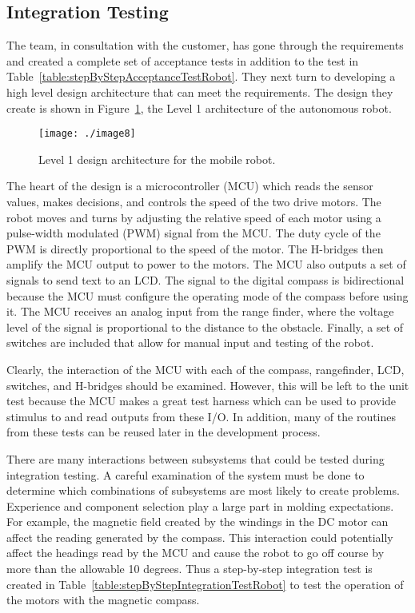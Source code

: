 \subsection*{Integration Testing}
\label{subsection:integration-testing-1}

The team, in consultation with the customer, has gone through the
requirements and created a complete set of acceptance tests in addition
to the test in Table~\ref{table:stepByStepAcceptanceTestRobot}. 
They next turn to developing a high level
design architecture that can meet the requirements. The design they
create is shown in 
Figure~\ref{figure:level1mobileRobot}, the Level 1 architecture of the
autonomous robot.


\begin{figure}[h]
\centering
\texttt{[image: ./image8]}
\caption{Level 1 design architecture for the mobile robot.}
\label{figure:level1mobileRobot}
\end{figure}

The heart of the design is a microcontroller (MCU) which reads the
sensor values, makes decisions, and controls the speed of the two drive
motors. The robot moves and turns by adjusting the relative speed of
each motor using a pulse-width modulated (PWM) signal from the MCU. The
duty cycle of the PWM is directly proportional to the speed of the
motor. The H-bridges then amplify the MCU output to power to the motors.
The MCU also outputs a set of signals to send text to an LCD. The signal
to the digital compass is bidirectional because the MCU must configure
the operating mode of the compass before using it. The MCU receives an
analog input from the range finder, where the voltage level of the
signal is proportional to the distance to the obstacle. Finally, a set
of switches are included that allow for manual input and testing of the
robot.

Clearly, the interaction of the MCU with each of the compass,
rangefinder, LCD, switches, and H-bridges should be examined. However,
this will be left to the unit test because the MCU makes a great test
harness which can be used to provide stimulus to and read outputs from
these I/O. In addition, many of the routines from these tests can be
reused later in the development process.

There are many interactions between subsystems that could be tested
during integration testing. A careful examination of the system must be
done to determine which combinations of subsystems are most likely to
create problems. Experience and component selection play a large part in
molding expectations. For example, the magnetic field created by the
windings in the DC motor can affect the reading generated by the
compass. This interaction could potentially affect the headings read by
the MCU and cause the robot to go off course by more than the allowable
10 degrees. Thus a step-by-step integration test is created in 
Table~\ref{table:stepByStepIntegrationTestRobot}
to test the operation of the motors with the magnetic compass.


